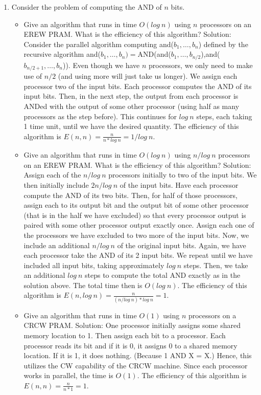 \documentclass{article}
\begin{document}
\begin{enumerate}
\setcounter{enumi}{0}
\item Consider the problem of computing the AND of $n$ bits.
\begin{itemize}
\item Give an algorithm that runs in time $O(log\ n)$ using $n$ processors on an EREW PRAM. What is the efficiency of this algorithm?
\newline
\newline Solution: Consider the parallel algorithm computing and($b_1,\ldots, b_n$) defined by the recursive algorithm and($b_1,\ldots, b_n)=$AND(and($b_1,\ldots, b_{n/2}$),and($b_{n/2+1},\ldots, b_n$)). Even though we have $n$ processors, we only need to make use of $n/2$ (and using more will just take us longer). We assign each processor two of the input bits. Each processor computes the AND of its input bits. Then, in the next step, the output from each processor is ANDed with the output of some other processor (using half as many processors as the step before). This continues for $log\ n$ steps, each taking 1 time unit, until we have the desired quantity. The efficiency of this algorithm is $E(n,n)=\frac{n}{n*log\ n}=1/log\ n$.
\newline
\item Give an algorithm that runs in time $O(log\ n)$ using $n/log\ n$ processors on an EREW PRAM. What is the efficiency of this algorithm?
\newline
\newline Solution: Assign each of the $n/log\ n$ processors initially to two  of the input bits. We then initially include $2n/log\ n$ of the input bits. Have each processor compute the AND of its two bits. Then, for half of those processors, assign each to its output bit and the output bit of some other processor (that is in the half we have excluded) so that every processor output is paired with some other processor output exactly once. Assign each one of the processors we have excluded to two more of the input bits. Now, we include an additional $n/log\ n$ of the original input bits. Again, we have each processor take the AND of its 2 input bits. We repeat until we have included all input bits, taking approximately $log\ n$ steps. Then, we take an additional $log\ n$ steps to compute the total AND exactly as in the solution above. The total time then is $O(log\ n)$. The efficiency of this algorithm is $E(n,log\ n)=\frac{n}{(n/log\ n)*log\ n}=1$.
\newline
\item Give an algorithm that runs in time $O(1)$ using $n$ processors on a CRCW PRAM.
\newline
\newline Solution: One processor initially assigns some shared memory location to 1. Then assign each bit to a processor. Each processor reads its bit and if it is 0, it assigns 0 to a shared memory location. If it is 1, it does nothing. (Because 1 AND X = X.) Hence, this utilizes the CW capability of the CRCW machine. Since each processor works in parallel, the time is $O(1)$. The efficiency of this algorithm is $E(n,n)=\frac{n}{n*1}=1$.
\end{itemize}
\end{enumerate}
\end{document}
